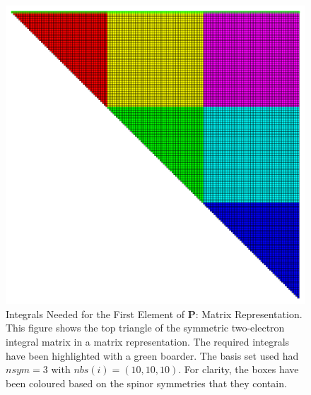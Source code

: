 \documentclass[12pt]{report}
\begin{document}
\begin{figure}
\includegraphics[width=1\textwidth]{Figures/eint2_mat_lots.png}
\caption[Integrals Needed for the First Element of \textbf{P}: Matrix Representation]
{Integrals Needed for the First Element of \textbf{P}: Matrix Representation. This figure shows the top triangle of the symmetric two-electron integral matrix in a matrix representation. The required integrals have been highlighted with a green boarder. The basis set used had $nsym=3$ with $nbs(i) = (10, 10, 10)$. For clarity, the boxes have been coloured based on the spinor symmetries that they contain.}
\label{fig:eint2matlots}
\end{figure}
\end{document}

